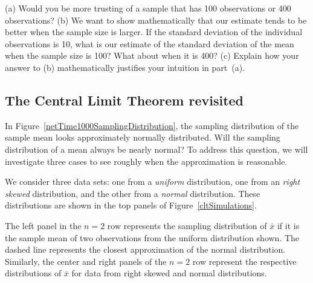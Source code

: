 \begin{exercisewrap}
\begin{nexercise}
(a) Would you be more trusting of a sample that has 100 observations or 400 observations? (b) We want to show mathematically that our estimate tends to be better when the sample size is larger. If the standard deviation of the individual observations is 10, what is our estimate of the standard deviation of the mean when the sample size is 100? What about when it is 400? (c) Explain how your answer to (b) mathematically justifies your intuition in part~(a).\footnotemark
\end{nexercise}
\end{exercisewrap}


\D{\newpage}

\subsection{The Central Limit Theorem revisited}
\label{cltSection}


In Figure~\ref{netTime1000SamplingDistribution}, the sampling distribution of the sample mean looks approximately normally distributed. Will the sampling distribution of a mean always be nearly normal? To address this question, we will investigate three cases to see roughly when the approximation is reasonable.

We consider three data sets: one from a \emph{uniform} distribution, one from an \emph{right skewed} distribution, and the other from a \emph{normal} distribution. These distributions are shown in the top panels of Figure~\ref{cltSimulations}. 


The left panel in the $n=2$ row represents the sampling distribution of $\bar{x}$ if it is the sample mean of two observations from the uniform distribution shown. The dashed line represents the closest approximation of the normal distribution. Similarly, the center and right panels of the $n=2$ row represent the respective distributions of $\bar{x}$ for data from right skewed and normal distributions.


